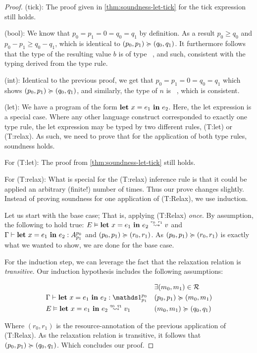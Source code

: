 \begin{proof}

(tick): The proof given in \cref{thm:soundness-let-tick} for the tick expression still holds.

(bool): We know that \(p_0 = p_1 = 0 = q_0 = q_1\) by definition. As a result \(p_0 \geq q_0\) and \(p_0 - p_1 \geq q_0 - q_1\), which is identical to \((p_0, p_1) \succcurlyeq (q_0, q_1)\). It furthermore follows that the type of the resulting value \(b\) is of type \bool~, and such, consistent with the typing derived from the type rule.

(int): Identical to the previous proof, we get that \(p_0 = p_1 = 0 = q_0 = q_1\) which shows \((p_0, p_1) \succcurlyeq (q_0, q_1)\), and similarly, the type of \(n\) is \typeint~, which is consistent.

(let): We have a program of the form \(\mathbf{let}~x = e_1~\mathbf{in}~e_2\). Here, the let expression is a special case. Where any other language construct corresponded to exactly one type rule, the let expression may be typed by two different rules, (T:let) or (T:relax). As such, we need to prove that for the application of both type rules, soundness holds.  

For (T:let): The proof from \cref{thm:soundness-let-tick} still holds.

For (T:relax): What is special for the (T:relax) inference rule is that it could be applied an arbitrary (finite!) number of times. Thus our prove changes slightly. Instead of proving soundness for one application of (T:Relax), we use induction. 

Let us start with the base case; That is, applying (T:Relax) \emph{once}. By assumption, the following to hold true: \(\evals{E}{\letexp{x}{e_1}{e_2}}{v}{r_0}{r_1}\) and \(\Gamma \vdash \mathbf{let}~x = e_1~\mathbf{in}~e_2 : A ^{p_0}_{p_1}\) and \((p_0, p_1) \succcurlyeq (r_0, r_1)\). As \((p_0, p_1) \succcurlyeq (r_0, r_1)\) is exactly what we wanted to show, we are done for the base case.

For the induction step, we can leverage the fact that the relaxation relation is \emph{transitive}. Our induction hypothesis includes the following assumptions:

   \begin{align*}
      &										    & &\exists (m_0, m_1) \in \resource\\
      &\typing{\Gamma}{\letexp{x}{e_1}{e_2}}{\ratype{\unit}{p_0}{p_1}}                   & &(p_0, p_1)\relaxation (m_0, m_1)\\
      &\evals{E}{\letexp{x}{e_1}{e_2}}{v_1}{q_0}{q_1}                               & &(m_0, m_1)\relaxation (q_0, q_1)\\
   \end{align*}

Where \((r_0, r_1)\) is the resource-annotation of the previous application of (T:Relax). As the relaxation relation is transitive, it follows that \((p_0, p_1) \succcurlyeq (q_0, q_1)\). Which concludes our proof.

\end{proof}





